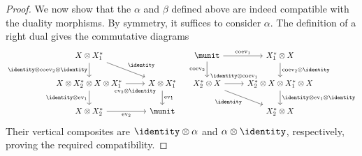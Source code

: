 \begin{proof}
	We now show that the $\alpha$ and $\beta$ defined above are indeed
	compatible with the duality morphisms. By symmetry, it suffices to
	consider $\alpha$. The definition of a right dual gives the commutative
	diagrams
	\[\begin{tikzcd}
		X \otimes X_1^* \arrow[rd, "{\identity}"] \arrow[d, "{\identity \otimes \mathrm{coev}_2 \otimes \identity}"'] & \\
		X \otimes X_2^* \otimes X \otimes X_1^* \arrow[r, "{\mathrm{ev}_2 \otimes \identity}"' inner sep=0.6em] \arrow[d, "{\identity \otimes \mathrm{ev}_1}"'] & X \otimes X_1^* \arrow[d, "{\mathrm{ev}_1}"] \\
		X \otimes X_2^* \arrow[r, "{\mathrm{ev}_2}"'] & \munit
	\end{tikzcd} \quad \begin{tikzcd}
		\munit \arrow[r, "{\mathrm{coev}_1}"] \arrow[d, "{\mathrm{coev}_2}"'] & X_1^* \otimes X \arrow[d, "{\mathrm{coev}_2 \otimes \identity}"] \\
		X_2^* \otimes X \arrow[r, "{\identity \otimes \mathrm{coev}_1}" inner sep=0.6em] \arrow[rd, "{\identity}"'] & X_2^* \otimes X \otimes X_1^* \otimes X \arrow[d, "{\identity \otimes \mathrm{ev}_1 \otimes \identity}"] \\
		& X_2^* \otimes X
	\end{tikzcd}\]
	Their vertical composites are $\identity\otimes\alpha$ and
	$\alpha\otimes\identity$, respectively, proving the required
	compatibility.


\end{proof}
